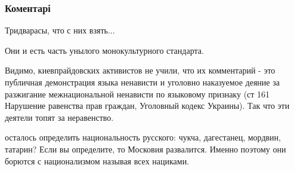  
 
 
 
 
\subsubsection{Коментарі}

\begin{itemize}
 
Тридварасы, что с них взять...

 
Они и есть часть унылого монокультурного стандарта.

 

Видимо, киевпрайдовских активистов не учили, что их комментарий - это публичная
демонстрация языка ненависти и уголовно наказуемое деяние за разжигание
межнациональной ненависти по языковому признаку (ст 161 Нарушение равенства
прав граждан, Уголовный кодекс Украины). Так что эти деятели топят за
неравенство.

\begin{itemize}
 

осталось определить национальность русского: чукча, дагестанец, мордвин,
татарин? Если вы определите, то Московия развалится. Именно поэтому они борются
с национализмом называя всех нациками.


\end{itemize}
\end{itemize}
